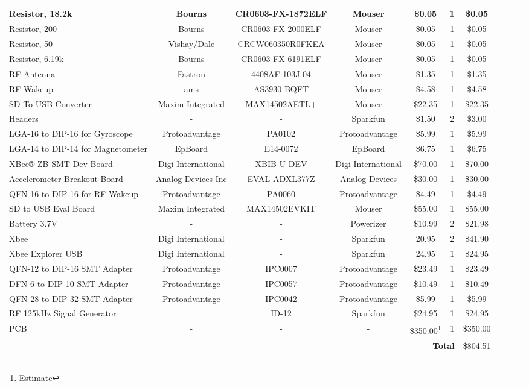 \begin{landscape}
{\begin{center}
\begin{longtable}{|p{1.5in}|c|c|c|c|c|c|}
    Resistor, 18.2k & Bourns & CR0603-FX-1872ELF & Mouser & \$0.05 & 1     & \$0.05 \\ \hline
    Resistor, 200 & Bourns & CR0603-FX-2000ELF & Mouser & \$0.05 & 1     & \$0.05 \\ \hline
    Resistor, 50 & Vishay/Dale & CRCW060350R0FKEA & Mouser & \$0.05 & 1     & \$0.05 \\ \hline
    Resistor, 6.19k & Bourns & CR0603-FX-6191ELF & Mouser & \$0.05 & 1     & \$0.05 \\ \hline
    RF Antenna & Fastron & 4408AF-103J-04 & Mouser & \$1.35 & 1     & \$1.35 \\ \hline
    RF Wakeup & ams   & AS3930-BQFT & Mouser & \$4.58 & 1     & \$4.58 \\ \hline
    SD-To-USB Converter & Maxim Integrated & MAX14502AETL+ & Mouser & \$22.35 & 1     & \$22.35 \\ \hline
    Headers & -     & -     & Sparkfun & \$1.50 & 2     & \$3.00 \\ \hline
    LGA-16 to DIP-16 for Gyroscope & Protoadvantage & PA0102 & Protoadvantage & \$5.99 & 1     & \$5.99 \\ \hline
    LGA-14 to DIP-14 for Magnetometer & EpBoard & E14-0072 & EpBoard & \$6.75 & 1     & \$6.75 \\ \hline
    XBee® ZB SMT Dev Board & Digi International & XBIB-U-DEV & Digi International & \$70.00 & 1     & \$70.00 \\ \hline
    Accelerometer Breakout Board & Analog Devices Inc & EVAL-ADXL377Z & Analog Devices & \$30.00 & 1     & \$30.00 \\ \hline
    QFN-16 to DIP-16 for RF Wakeup & Protoadvantage & PA0060 & Protoadvantage & \$4.49 & 1     & \$4.49 \\ \hline
    SD to USB Eval Board & Maxim Integrated & MAX14502EVKIT & Mouser & \$55.00 & 1     & \$55.00 \\ \hline
    Battery 3.7V & -     & -     & Powerizer & \$10.99 & 2     & \$21.98 \\ \hline
    Xbee  & Digi International & -     & Sparkfun & 20.95 & 2     & \$41.90 \\ \hline
    Xbee Explorer USB & Digi International & -     & Sparkfun & 24.95 & 1     & \$24.95 \\ \hline
    QFN-12 to DIP-16 SMT Adapter & Protoadvantage & IPC0007 & Protoadvantage & \$23.49 & 1     & \$23.49 \\ \hline
    DFN-6 to DIP-10 SMT Adapter & Protoadvantage & IPC0057 & Protoadvantage & \$10.49 & 1     & \$10.49 \\ \hline
    QFN-28 to DIP-32 SMT Adapter & Protoadvantage & IPC0042 & Protoadvantage & \$5.99 & 1     & \$5.99 \\ \hline
    RF 125kHz Signal Generator &       & ID-12 & Sparkfun & \$24.95 & 1     & \$24.95 \\ \hline
    PCB   & -     & -     & -     & \$350.00\footnote{Estimate} & 1     & \$350.00 \\ \hline
    \multicolumn{6}{|r|}{\textbf{Total}}            & \$804.51  \\ \hline
    

\end{longtable}
\end{center}}
\end{landscape}
